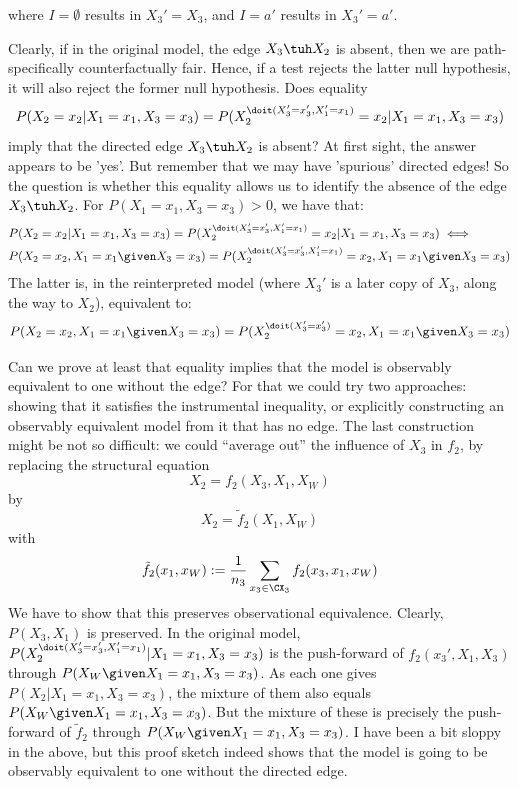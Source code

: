 \begin{centering}\end{centering}

where $I=\emptyset$ results in $X_3' = X_3$, and $I=a'$ results in $X_3' = a'$.

Clearly, if in the original model, the edge $X_3 \tuh X_2$ is absent, then we are path-specifically counterfactually fair.
Hence, if a test rejects the latter null hypothesis, it will also reject the former null hypothesis.
Does equality
$$P(X_2=x_2 |X_1=x_1, X_3=x_3)=P(X_2^{\doit(X_3'=x_3',X_1'=x_1)}=x_2| X_1=x_1,X_3=x_3)$$
imply that the directed edge $X_3 \tuh X_2$ is absent?
At first sight, the answer appears to be 'yes'. But remember that we may have 'spurious' directed edges!
So the question is whether this equality allows us to identify the absence of the edge $X_3 \tuh X_2$.
For $P(X_1=x_1,X_3=x_3) > 0$, we have that:
\begin{equation*}\begin{split}
  &P(X_2=x_2 |X_1=x_1, X_3=x_3)=P(X_2^{\doit(X_3'=x_3',X_1'=x_1)}=x_2| X_1=x_1,X_3=x_3) \iff \\
  &P(X_2=x_2, X_1=x_1 \given X_3=x_3)=P(X_2^{\doit(X_3'=x_3',X_1'=x_1)}=x_2, X_1=x_1 \given X_3=x_3) 
\end{split}\end{equation*}
The latter is, in the reinterpreted model (where $X_3'$ is a later copy of $X_3$, along the way to $X_2$), equivalent to:
  $$P(X_2=x_2, X_1=x_1 \given X_3=x_3)=P(X_2^{\doit(X_3'=x_3')}=x_2, X_1=x_1 \given X_3=x_3)$$

Can we prove at least that equality implies that the model is observably equivalent to one without the edge?
For that we could try two approaches: showing that it satisfies the instrumental inequality, or explicitly constructing
an observably equivalent model from it that has no edge. The last construction might be not so difficult: we could
``average out'' the influence of $X_3$ in $f_2$, by replacing the structural equation
$$X_2 = f_2(X_3,X_1,X_W)$$
by
$$X_2 = \tilde{f}_2(X_1,X_W)$$
with
$$\tilde{f}_2(x_1,x_W) := \frac{1}{n_3} \sum_{x_3 \in \CX_3} f_2(x_3,x_1,x_W)$$
We have to show that this preserves observational equivalence. Clearly, $P(X_3,X_1)$ is preserved.
In the original model, $P(X_2^{\doit(X_3'=x_3',X_1'=x_1)} | X_1=x_1,X_3=x_3)$ is the push-forward
of $f_2(x_3',X_1,X_3)$ through $P(X_W \given X_1=x_1,X_3=x_3)$.
As each one gives $P(X_2|X_1=x_1,X_3=x_3)$, the mixture of them also equals $P(X_W \given X_1=x_1,X_3=x_3)$.
But the mixture of these is precisely the push-forward of $\tilde{f}_2$ through $P(X_W \given X_1=x_1,X_3=x_3)$.
I have been a bit sloppy in the above, but this proof sketch indeed shows that the model is going to be 
observably equivalent to one without the directed edge.

